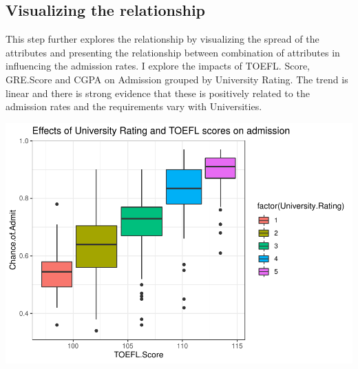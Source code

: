 \documentclass[11pt,]{article}
\newenvironment{Shaded}{\begin{snugshade}}{\end{snugshade}}
\newcommand{\DataTypeTok}[1]{\textcolor[rgb]{0.13,0.29,0.53}{#1}}
\newcommand{\KeywordTok}[1]{\textcolor[rgb]{0.13,0.29,0.53}{\textbf{#1}}}
\newcommand{\NormalTok}[1]{#1}
\newcommand{\OperatorTok}[1]{\textcolor[rgb]{0.81,0.36,0.00}{\textbf{#1}}}
\newcommand{\StringTok}[1]{\textcolor[rgb]{0.31,0.60,0.02}{#1}}
\begin{document}
\hypertarget{visualizing-the-relationship}{%
\subsection{Visualizing the
relationship}\label{visualizing-the-relationship}}

This step further explores the relationship by visualizing the spread of
the attributes and presenting the relationship between combination of
attributes in influencing the admission rates. I explore the impacts of
TOEFL. Score, GRE.Score and CGPA on Admission grouped by University
Rating. The trend is linear and there is strong evidence that these is
positively related to the admission rates and the requirements vary with
Universities.

\begin{Shaded}
\end{Shaded}

\includegraphics{USGradAdmission_files/figure-latex/unnamed-chunk-6-1.pdf}
\end{document}
